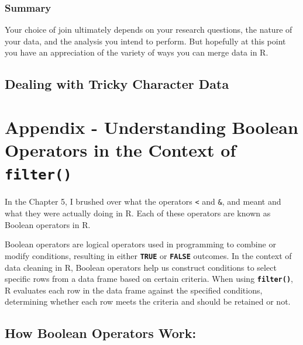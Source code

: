 \documentclass[
]{book}
\begin{document}
\hypertarget{summary-8}{%
\subsection{Summary}\label{summary-8}}

Your choice of join ultimately depends on your research questions, the nature of your data, and the analysis you intend to perform. But hopefully at this point you have an appreciation of the variety of ways you can merge data in R.

\hypertarget{dealing-with-tricky-character-data}{%
\section{Dealing with Tricky Character Data}\label{dealing-with-tricky-character-data}}

\hypertarget{appendix---understanding-boolean-operators-in-the-context-of-filter}{%
\chapter{\texorpdfstring{Appendix - Understanding Boolean Operators in the Context of \texttt{filter()}}{Appendix - Understanding Boolean Operators in the Context of filter()}}\label{appendix---understanding-boolean-operators-in-the-context-of-filter}}

In the Chapter 5, I brushed over what the operators \texttt{\textless{}} and \texttt{\&}, and \texttt{\textbar{}} meant and what they were actually doing in R. Each of these operators are known as Boolean operators in R.

Boolean operators are logical operators used in programming to combine or modify conditions, resulting in either \textbf{\texttt{TRUE}} or \textbf{\texttt{FALSE}} outcomes. In the context of data cleaning in R, Boolean operators help us construct conditions to select specific rows from a data frame based on certain criteria. When using \textbf{\texttt{filter()}}, R evaluates each row in the data frame against the specified conditions, determining whether each row meets the criteria and should be retained or not.

\hypertarget{how-boolean-operators-work}{%
\section{How Boolean Operators Work:}\label{how-boolean-operators-work}}
\end{document}
